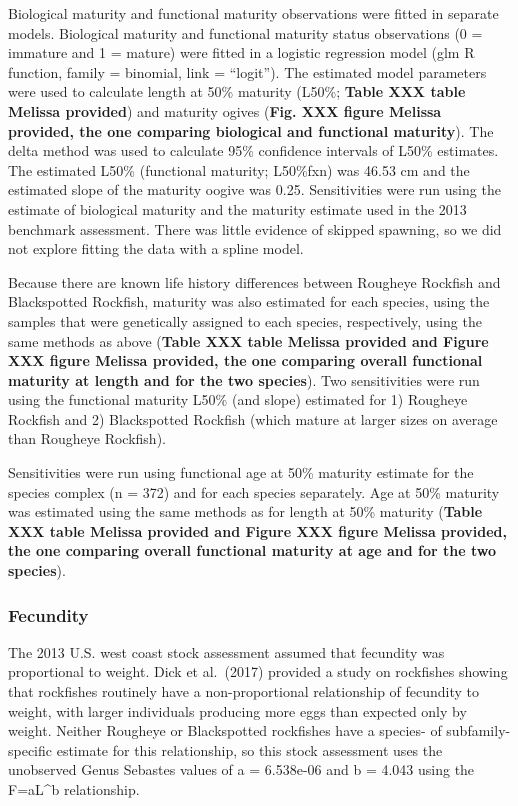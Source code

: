 \documentclass[
]{scrartcl}
\begin{document}
Biological maturity and functional maturity observations were fitted in
separate models. Biological maturity and functional maturity status
observations (0 = immature and 1 = mature) were fitted in a logistic
regression model (glm R function, family = binomial, link = ``logit'').
The estimated model parameters were used to calculate length at 50\%
maturity (L50\%; \textbf{Table XXX table Melissa provided}) and maturity
ogives (\textbf{Fig. XXX figure Melissa provided, the one comparing
biological and functional maturity}). The delta method was used to
calculate 95\% confidence intervals of L50\% estimates. The estimated
L50\% (functional maturity; L50\%fxn) was 46.53 cm and the estimated
slope of the maturity oogive was 0.25. Sensitivities were run using the
estimate of biological maturity and the maturity estimate used in the
2013 benchmark assessment. There was little evidence of skipped
spawning, so we did not explore fitting the data with a spline model.

Because there are known life history differences between Rougheye
Rockfish and Blackspotted Rockfish, maturity was also estimated for each
species, using the samples that were genetically assigned to each
species, respectively, using the same methods as above (\textbf{Table
XXX table Melissa provided and Figure XXX figure Melissa provided, the
one comparing overall functional maturity at length and for the two
species}). Two sensitivities were run using the functional maturity
L50\% (and slope) estimated for 1) Rougheye Rockfish and 2) Blackspotted
Rockfish (which mature at larger sizes on average than Rougheye
Rockfish).

Sensitivities were run using functional age at 50\% maturity estimate
for the species complex (n = 372) and for each species separately. Age
at 50\% maturity was estimated using the same methods as for length at
50\% maturity (\textbf{Table XXX table Melissa provided and Figure XXX
figure Melissa provided, the one comparing overall functional maturity
at age and for the two species}).

\subsubsection{Fecundity}\label{fecundity}

The 2013 U.S. west coast stock assessment assumed that fecundity was
proportional to weight. Dick et al.~(2017) provided a study on
rockfishes showing that rockfishes routinely have a non-proportional
relationship of fecundity to weight, with larger individuals producing
more eggs than expected only by weight. Neither Rougheye or Blackspotted
rockfishes have a species- of subfamily-specific estimate for this
relationship, so this stock assessment uses the unobserved Genus
Sebastes values of a = 6.538e-06 and b = 4.043 using the F=aL\^{}b
relationship.
\end{document}

